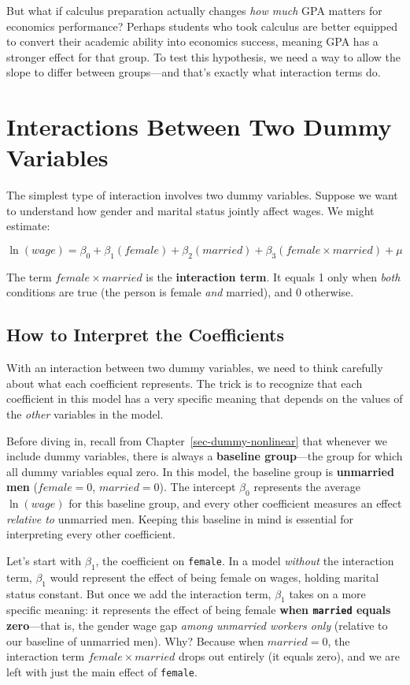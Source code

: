 \documentclass[
  letterpaper,
  DIV=11,
  numbers=noendperiod]{scrreprt}
\begin{document}
But what if calculus preparation actually changes \emph{how much} GPA
matters for economics performance? Perhaps students who took calculus
are better equipped to convert their academic ability into economics
success, meaning GPA has a stronger effect for that group. To test this
hypothesis, we need a way to allow the slope to differ between
groups---and that's exactly what interaction terms do.

\section{Interactions Between Two Dummy
Variables}\label{interactions-between-two-dummy-variables}

The simplest type of interaction involves two dummy variables. Suppose
we want to understand how gender and marital status jointly affect
wages. We might estimate:

\[
\ln(wage) = \beta_0 + \beta_1(female) + \beta_2(married) + \beta_3(female \times married) + \mu
\]

The term \(female \times married\) is the \textbf{interaction term}. It
equals 1 only when \emph{both} conditions are true (the person is female
\emph{and} married), and 0 otherwise.

\subsection{How to Interpret the
Coefficients}\label{how-to-interpret-the-coefficients}

With an interaction between two dummy variables, we need to think
carefully about what each coefficient represents. The trick is to
recognize that each coefficient in this model has a very specific
meaning that depends on the values of the \emph{other} variables in the
model.

Before diving in, recall from Chapter~\ref{sec-dummy-nonlinear} that
whenever we include dummy variables, there is always a \textbf{baseline
group}---the group for which all dummy variables equal zero. In this
model, the baseline group is \textbf{unmarried men} (\(female = 0\),
\(married = 0\)). The intercept \(\beta_0\) represents the average
\(\ln(wage)\) for this baseline group, and every other coefficient
measures an effect \emph{relative to} unmarried men. Keeping this
baseline in mind is essential for interpreting every other coefficient.

Let's start with \(\beta_1\), the coefficient on \texttt{female}. In a
model \emph{without} the interaction term, \(\beta_1\) would represent
the effect of being female on wages, holding marital status constant.
But once we add the interaction term, \(\beta_1\) takes on a more
specific meaning: it represents the effect of being female \textbf{when
\texttt{married} equals zero}---that is, the gender wage gap \emph{among
unmarried workers only} (relative to our baseline of unmarried men).
Why? Because when \(married = 0\), the interaction term
\(female \times married\) drops out entirely (it equals zero), and we
are left with just the main effect of \texttt{female}.
\end{document}

